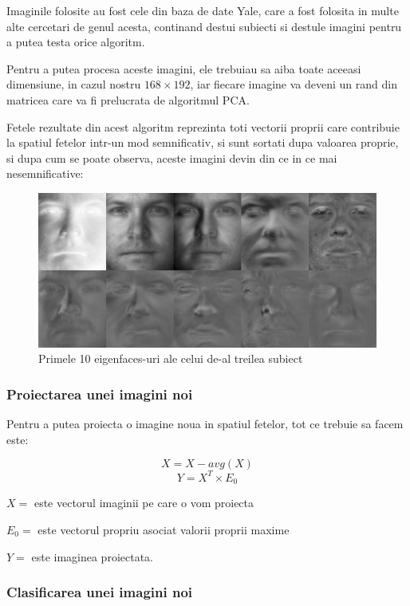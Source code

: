 \documentclass[12pt,oneside]{article}
\begin{document}
Imaginile folosite au fost cele din baza de date Yale, care a fost folosita in multe alte cercetari de genul acesta, continand destui subiecti si destule imagini pentru a putea testa orice algoritm.\cite{yale_db} \cite{KCLee05}

Pentru a putea procesa aceste imagini, ele trebuiau sa aiba toate aceeasi dimensiune, in cazul nostru $168 \times 192$, iar fiecare imagine va deveni un rand din matricea care va fi prelucrata de algoritmul PCA.

Fetele rezultate din acest algoritm reprezinta toti vectorii proprii care contribuie la spatiul fetelor intr-un mod semnificativ, si sunt sortati dupa valoarea proprie, si dupa cum se poate observa, aceste imagini devin din ce in ce mai nesemnificative: 

\begin{figure}[H]
\centering
\caption{Primele 10 eigenfaces-uri ale celui de-al treilea subiect}
\includegraphics[width=\linewidth]{eigenfaces}
\end{figure}

\subsubsection{Proiectarea unei imagini noi}
Pentru a putea proiecta o imagine noua in spatiul fetelor, tot ce trebuie sa facem este: 

\begin{equation}
X=X-avg(X)
\end{equation}
\begin{equation}
Y=X^T \times E_0
\end{equation}

$X=$ este vectorul imaginii pe care o vom proiecta

$E_0=$ este vectorul propriu asociat valorii proprii maxime

$Y=$ este imaginea proiectata.

\subsubsection{Clasificarea unei imagini noi}
\end{document}

